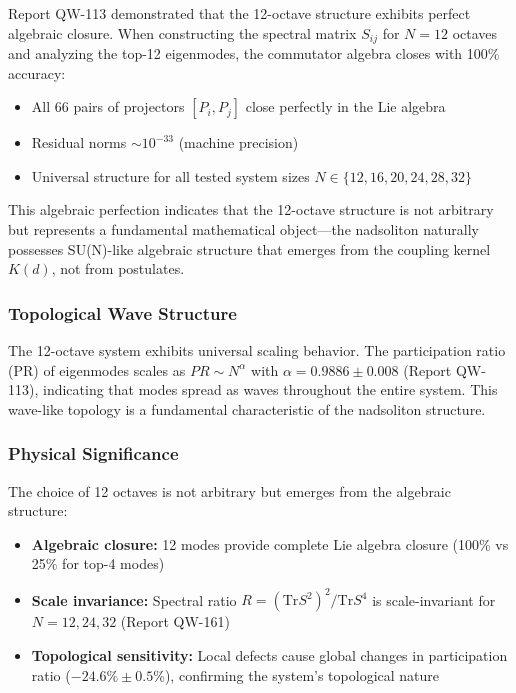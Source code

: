 \documentclass[11pt, a4paper]{article}
\begin{document}
Report QW-113 demonstrated that the 12-octave structure exhibits perfect algebraic closure. When constructing the spectral matrix $S_{ij}$ for $N = 12$ octaves and analyzing the top-12 eigenmodes, the commutator algebra closes with 100\% accuracy:
\begin{itemize}
    \item All 66 pairs of projectors $[P_i, P_j]$ close perfectly in the Lie algebra
    \item Residual norms $\sim 10^{-33}$ (machine precision)
    \item Universal structure for all tested system sizes $N \in \{12, 16, 20, 24, 28, 32\}$
\end{itemize}

This algebraic perfection indicates that the 12-octave structure is not arbitrary but represents a fundamental mathematical object—the nadsoliton naturally possesses SU(N)-like algebraic structure that emerges from the coupling kernel $K(d)$, not from postulates.

\subsubsection{Topological Wave Structure}

The 12-octave system exhibits universal scaling behavior. The participation ratio (PR) of eigenmodes scales as $PR \sim N^\alpha$ with $\alpha = 0.9886 \pm 0.008$ (Report QW-113), indicating that modes spread as waves throughout the entire system. This wave-like topology is a fundamental characteristic of the nadsoliton structure.

\subsubsection{Physical Significance}

The choice of 12 octaves is not arbitrary but emerges from the algebraic structure:
\begin{itemize}
    \item \textbf{Algebraic closure:} 12 modes provide complete Lie algebra closure (100\% vs 25\% for top-4 modes)
    \item \textbf{Scale invariance:} Spectral ratio $R = (\text{Tr} S^2)^2/\text{Tr} S^4$ is scale-invariant for $N = 12, 24, 32$ (Report QW-161)
    \item \textbf{Topological sensitivity:} Local defects cause global changes in participation ratio ($-24.6\% \pm 0.5\%$), confirming the system's topological nature
\end{itemize}
\end{document}

